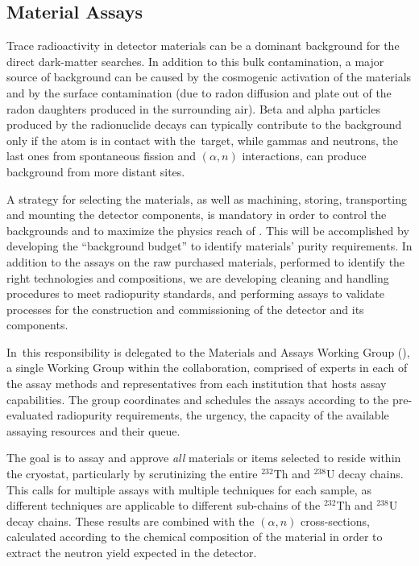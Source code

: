 \subsection{Material Assays}
\label{sec:Materials}

Trace radioactivity in detector materials can be a dominant background for the direct dark-matter searches. In addition to this bulk contamination, a major source of background can be caused by the cosmogenic activation of the materials and by the surface contamination (due to radon diffusion and plate out of the radon daughters produced in the surrounding air).
Beta and alpha particles produced by the radionuclide decays can typically contribute to the background only if the atom is in contact with the \LAr\,target, while gammas and neutrons, the last ones from spontaneous fission and $(\alpha,n)$ interactions, can produce background from more distant sites.

A strategy for selecting the materials, as well as machining, storing, transporting and mounting the detector components, is mandatory in order to control the backgrounds and to maximize the physics reach of \DSks. This will be accomplished by developing the ``background budget'' to identify materials' purity requirements. In addition to the assays on the raw purchased materials, performed to identify the right technologies and compositions, we are developing cleaning and handling procedures to meet radiopurity standards, and performing assays to validate processes for the construction and commissioning of the detector and its components.

In \DSks\,this responsibility is delegated to the Materials and Assays Working Group (\MAWG), a single Working Group within the collaboration, comprised of experts in each of the assay methods and representatives from each institution that hosts assay capabilities. The group coordinates and schedules the assays according to the pre-evaluated radiopurity requirements, the urgency, the capacity of the available assaying resources and their queue.

The goal is to assay and approve {\it all} materials or items selected to reside within the cryostat, particularly by scrutinizing the entire $^{232}$Th and $^{238}$U decay chains. This calls for multiple assays with multiple techniques for each sample, as different techniques are applicable to different sub-chains of the $^{232}$Th and $^{238}$U decay chains. These results are combined with the $(\alpha,n)$ cross-sections, calculated according to the chemical composition of the material in order to extract the neutron yield expected in the detector.


